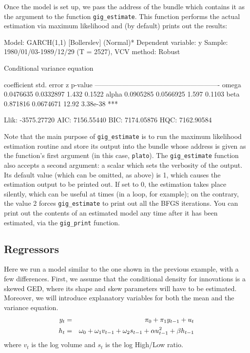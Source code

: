 \documentclass[a4paper,11pt]{article}
\newcommand{\uhat}{\ensuremath u}
\begin{document}
Once the model is set up, we pass the address of the bundle which
contains it as the argument to the function
\texttt{gig\_estimate}. This function performs the actual estimation
via maximum likelihood and (by default) prints out the results:
\begin{code}
Model: GARCH(1,1) [Bollerslev] (Normal)*
Dependent variable: y
Sample: 1980/01/03-1989/12/29 (T = 2527), VCV method: Robust

    Conditional variance equation

             coefficient   std. error     z      p-value 
  -------------------------------------------------------
  omega       0.0476635    0.0332897     1.432   0.1522  
  alpha       0.0905285    0.0566925     1.597   0.1103  
  beta        0.871816     0.0674671    12.92    3.38e-38 ***

	Llik:  -3575.27720	 AIC:   7156.55440
	BIC:    7174.05876	 HQC:   7162.90584
\end{code}

Note that the main purpose of \texttt{gig\_estimate} is to run the
maximum likelihood estimation routine and store its output into the
bundle whose address is given as the function's first argument (in
this case, \texttt{plato}). The \texttt{gig\_estimate} function also
accepts a second argument: a scalar which sets the verbosity of the
output. Its default value (which can be omitted, as above) is 1, which
causes the estimation output to be printed out. If set to 0, the
estimation takes place silently, which can be useful at times (in a
loop, for example); on the contrary, the value 2 forces
\texttt{gig\_estimate} to print out all the BFGS iterations. You can
print out the contents of an estimated model any time after it has
been estimated, via the \texttt{gig\_print} function.

\subsection{Regressors}
\label{sec:regressors}

Here we run a model similar to the one shown in the previous example,
with a few differences. First, we assume that the conditional density
for innovations is a skewed GED, where its shape and skew parameters
will have to be estimated. Moreover, we will introduce explanatory
variables for both the mean and the variance equation.
\begin{eqnarray*}
  y_t & = & \pi_0 + \pi_1 y_{t-1} + \uhat_{t} \\
  h_t & = & \omega_0 +
  \omega_1 v_{t-1} + \omega_2 s_{t-1} +
  \alpha \uhat_{t-1}^2 + \beta h_{t-1}
\end{eqnarray*}
where $v_t$ is the log volume and $s_t$ is the log High/Low ratio.
\end{document}
